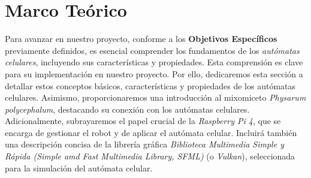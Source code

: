 \section{Marco Te\'orico}
\label{sec:marco_teorico}
    Para avanzar en nuestro proyecto, conforme a los \textbf{Objetivos Espec\'ificos} previamente definidos, 
        es esencial comprender los fundamentos de los \textit{aut\'omatas celulares}, incluyendo sus caracter\'isticas 
        y propiedades. Esta comprensi\'on es clave para su implementaci\'on en nuestro proyecto. Por ello, dedicaremos 
        esta secci\'on a detallar estos conceptos b\'asicos, caracter\'isticas y propiedades de los aut\'omatas celulares. 
        Asimismo, proporcionaremos una introducci\'on al mixomiceto \textit{Physarum polycephalum}, destacando su conexi\'on 
        con los aut\'omatas celulares.
    \vskip 0.5cm
    Adicionalmente, subrayaremos el papel crucial de la \textit{Raspberry Pi 4}, 
        que se encarga de gestionar el robot y de aplicar el aut\'omata celular. Incluir\'a 
        tambi\'en una descripci\'on concisa de la librer\'ia gr\'afica \textit{Biblioteca Multimedia Simple y R\'apida (Simple amd Fast Multimedia Library, SFML)} (o \textit{Vulkan}), 
        seleccionada para la simulaci\'on del aut\'omata celular.

    
    
    
    
    
